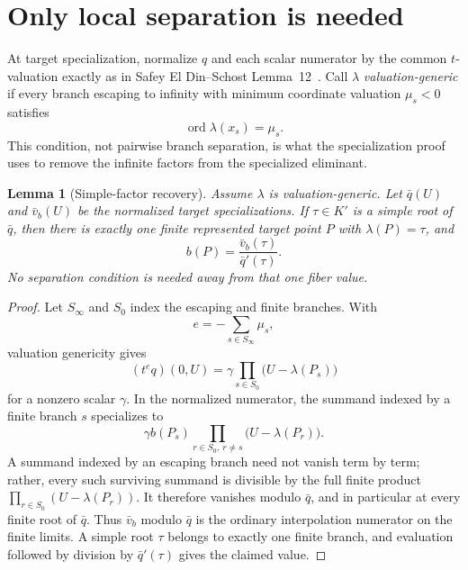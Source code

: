 \documentclass[11pt]{article}
\newtheorem{lemma}[theorem]{Lemma}
\theoremstyle{definition}
\newcommand{\ord}{\operatorname{ord}}
\begin{document}
\section{Only local separation is needed}\label{sec:local}

At target specialization, normalize $q$ and each scalar numerator by the common $t$-valuation exactly as in Safey El Din--Schost Lemma~12~\cite{SafeySchost2018}.  Call $\lambda$ \emph{valuation-generic} if every branch escaping to infinity with minimum coordinate valuation $\mu_s<0$ satisfies
\[
 \ord \lambda(x_s)=\mu_s.
\]
This condition, not pairwise branch separation, is what the specialization proof uses to remove the infinite factors from the specialized eliminant.

\begin{lemma}[Simple-factor recovery]\label{lem:simple}
Assume $\lambda$ is valuation-generic.  Let $\bar q(U)$ and $\bar v_b(U)$ be the normalized target specializations.  If $\tau\in K'$ is a simple root of $\bar q$, then there is exactly one finite represented target point $P$ with $\lambda(P)=\tau$, and
\[
 b(P)=\frac{\bar v_b(\tau)}{\bar q'(\tau)}.
\]
No separation condition is needed away from that one fiber value.
\end{lemma}

\begin{proof}
Let $S_\infty$ and $S_0$ index the escaping and finite branches.  With
\[
 e=-\sum_{s\in S_\infty}\mu_s,
\]
valuation genericity gives
\[
 (t^e q)(0,U)=\gamma\prod_{s\in S_0}
   \bigl(U-\lambda(P_s)\bigr)
\]
for a nonzero scalar $\gamma$.  In the normalized numerator, the summand indexed by a finite branch $s$ specializes to
\[
 \gamma b(P_s)\prod_{r\in S_0,\ r\ne s}
   \bigl(U-\lambda(P_r)\bigr).
\]
A summand indexed by an escaping branch need not vanish term by term; rather, every such surviving summand is divisible by the full finite product $\prod_{r\in S_0}(U-\lambda(P_r))$.  It therefore vanishes modulo $\bar q$, and in particular at every finite root of $\bar q$.  Thus $\bar v_b$ modulo $\bar q$ is the ordinary interpolation numerator on the finite limits.  A simple root $\tau$ belongs to exactly one finite branch, and evaluation followed by division by $\bar q'(\tau)$ gives the claimed value.
\end{proof}
\end{document}
